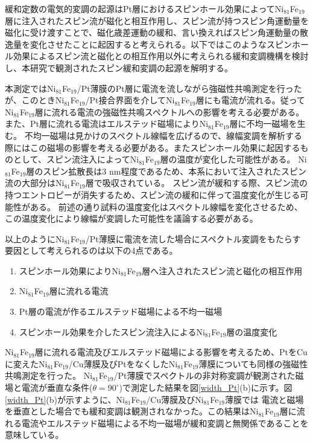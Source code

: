 緩和定数の電気的変調の起源はPt層におけるスピンホール効果によってNi$_{81}$Fe$_{19}$層に注入されたスピン流が磁化と相互作用し、スピン流が持つスピン角運動量を磁化に受け渡すことで、磁化歳差運動の緩和、言い換えればスピン角運動量の散逸量を変化させたことに起因すると考えられる。以下ではこのようなスピンホール効果によるスピン流と磁化との相互作用以外に考えられる緩和変調機構を検討し、本研究で観測されたスピン緩和変調の起源を解明する。



本測定ではNi$_{81}$Fe$_{19}$/Pt薄膜のPt層に電流を流しながら強磁性共鳴測定を行ったが、このときNi$_{81}$Fe$_{19}$/Pt接合界面を介してNi$_{81}$Fe$_{19}$層にも電流が流れる。従ってNi$_{81}$Fe$_{19}$層に流れる電流の強磁性共鳴スペクトルへの影響を考える必要がある。
また、Pt層に流れる電流はエルステッド磁場によりNi$_{81}$Fe$_{19}$層に不均一磁場を生む。
不均一磁場は見かけのスペクトル線幅を広げるので、線幅変調を解析する際にはこの磁場の影響を考える必要がある。またスピンホール効果に起因するものとして、スピン流注入によってNi$_{81}$Fe$_{19}$層の温度が変化した可能性がある。
Ni$_{81}$Fe$_{19}$層のスピン拡散長は3 nm程度\cite{Bass}であるため、本系において注入されたスピン流の大部分はNi$_{81}$Fe$_{19}$層で吸収されている。
スピン流が緩和する際、スピン流の持つエントロピーが消失するため、スピン流の緩和に伴って温度変化が生じる可能性がある。
前述の通り試料の温度変化はスペクトル線幅を変化させるため、この温度変化により線幅が変調した可能性を議論する必要がある。

以上のようにNi$_{81}$Fe$_{19}$/Pt薄膜に電流を流した場合にスペクトル変調をもたらす要因として考えられるのは以下の4点である。
\begin{enumerate}
\item スピンホール効果によりNi$_{81}$Fe$_{19}$層へ注入されたスピン流と磁化の相互作用
\item Ni$_{81}$Fe$_{19}$層に流れる電流
\item Pt層の電流が作るエルステッド磁場による不均一磁場
\item スピンホール効果を介したスピン流注入によるNi$_{81}$Fe$_{19}$層の温度変化
\end{enumerate}



Ni$_{81}$Fe$_{19}$層に流れる電流及びエルステッド磁場による影響を考えるため、PtをCuに変えたNi$_{81}$Fe$_{19}$/Cu薄膜及びPtをなくしたNi$_{81}$Fe$_{19}$薄膜についても同様の強磁性共鳴測定を行った。
Ni$_{81}$Fe$_{19}$/Pt薄膜でスペクトルの非対称変調が観測された磁場と電流が垂直な条件($\theta=90^\circ$)で測定した結果を図\ref{width_Pt}(b)に示す。図\ref{width_Pt}(b)が示すように、Ni$_{81}$Fe$_{19}$/Cu薄膜及びNi$_{81}$Fe$_{19}$薄膜では
電流と磁場を垂直とした場合でも緩和変調は観測されなかった。この結果はNi$_{81}$Fe$_{19}$層に流れる電流やエルステッド磁場による不均一磁場が緩和変調と無関係であることを意味している。



